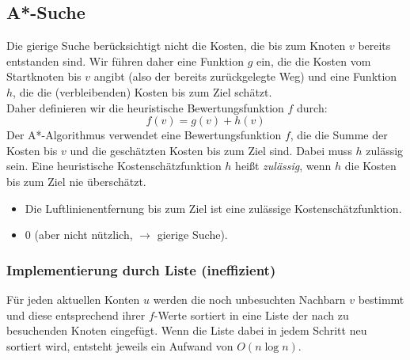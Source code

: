 \subsection{A*-Suche}
Die gierige Suche berücksichtigt nicht die Kosten, die bis zum Knoten $v$ bereits entstanden sind. Wir führen daher eine Funktion $g$ ein, die die Kosten vom Startknoten bis $v$ angibt (also der bereits zurückgelegte Weg) und eine Funktion $h$, die die (verbleibenden) Kosten bis zum Ziel schätzt.\\
Daher definieren wir die heuristische Bewertungsfunktion $f$ durch:
$$f(v)=g(v)+h(v)$$
Der A*-Algorithmus verwendet eine Bewertungsfunktion $f$, die die Summe der Kosten bis $v$ und die geschätzten Kosten bis zum Ziel sind. Dabei muss $h$ zulässig sein.
 Eine heuristische Kostenschätzfunktion $h$ heißt \emph{zulässig}, wenn $h$ die Kosten bis zum Ziel nie überschätzt.
\begin{itemize}
\item Die Luftlinienentfernung bis zum Ziel ist eine zulässige Kostenschätzfunktion.
\item $0$ (aber nicht nützlich, $\to$ gierige Suche).
\end{itemize}
\bigskip

\subsubsection{Implementierung durch Liste (ineffizient)}
Für jeden aktuellen Konten $u$ werden die noch unbesuchten Nachbarn $v$ bestimmt und diese entsprechend ihrer $f$-Werte sortiert in eine Liste der nach zu besuchenden Knoten eingefügt. Wenn die Liste dabei in jedem Schritt neu sortiert wird, entsteht jeweils ein Aufwand von $O(n \log n)$.
